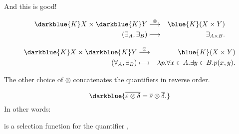 \documentclass%
[%
Screen4to3,
]{foils}
\begin{document}

And this is good!






\begin{eqnarray*}
\darkblue{K} X \times \darkblue{K} Y & \stackrel{\otimes}{\longrightarrow} & \blue{K} (X \times Y ) \\
(\exists_A, \exists_B) & \longmapsto & \exists_{A \times B}.
\end{eqnarray*}

\vfill

\begin{eqnarray*}
\darkblue{K} X \times \darkblue{K} Y & \stackrel{\otimes}{\longrightarrow} & \blue{K} (X \times Y ) \\
(\forall_A, \exists_B) & \longmapsto & \lambda p.\forall x \in A.\exists y \in B.p(x,y).
\end{eqnarray*}

\vfill

The other choice of $\otimes$ concatenates the quantifiers in
reverse order.


\[
\darkblue{\overline{\varepsilon \otimes \delta} = \overline{\varepsilon} \otimes \overline{\delta}.}
\]
In other words:

\vfill


\quad {}

\qquad {} is a selection function for
the quantifier ,
\end{document}
